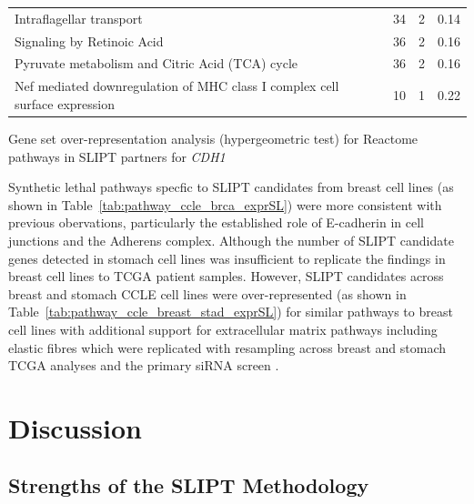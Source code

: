 \begin{table}[!tb]
{\begin{threeparttable}
\begin{tabular}{lccc}
  \rowcolor{black!10}
  Intraflagellar transport &  34 &   2 & 0.14 \\ 
  \rowcolor{black!5}
  Signaling by Retinoic Acid &  36 &   2 & 0.16 \\ 
  \rowcolor{black!10}
  Pyruvate metabolism and Citric Acid (TCA) cycle &  36 &   2 & 0.16 \\ 
  \rowcolor{black!5}
  Nef mediated downregulation of MHC class I complex cell surface expression &  10 &   1 & 0.22 \\ 
  \hline
\end{tabular}
\begin{tablenotes}
\raggedright \small
Gene set over-representation analysis (hypergeometric test) for Reactome pathways in \gls{SLIPT} partners for \textit{CDH1}
\end{tablenotes}
\end{threeparttable}
}
\end{table}


Synthetic lethal pathways specfic to \gls{SLIPT} candidates from breast cell lines (as shown in Table~\ref{tab:pathway_ccle_brca_exprSL}) were more consistent with previous obervations, particularly the established role of E-cadherin in cell junctions and the Adherens complex. Although the number of \gls{SLIPT} candidate genes detected in stomach cell lines was insufficient to replicate the findings in breast cell lines to TCGA patient samples. However, \gls{SLIPT} candidates across breast and stomach CCLE cell lines were over-represented (as shown in Table~\ref{tab:pathway_ccle_breast_stad_exprSL}) for similar pathways to breast cell lines with additional support for extracellular matrix pathways including elastic fibres which were replicated with resampling across breast and stomach TCGA analyses and the primary siRNA screen \citet{Telford2015}.

\FloatBarrier

\section{Discussion}

\subsection{Strengths of the SLIPT Methodology}

